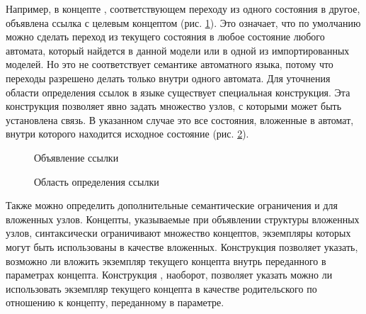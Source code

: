 Например, в концепте
, соответствующем переходу из одного состояния в другое, объявлена ссылка 
 с целевым концептом  (рис. \ref{fig:LinkDeclaration}). Это означает, что по
умолчанию можно сделать переход из текущего состояния в любое состояние любого автомата, который найдется в данной модели
или в одной из импортированных моделей. Но это не соответствует семантике автоматного языка, потому что переходы разрешено
делать только внутри одного автомата. Для уточнения области определения ссылок в языке 
 существует специальная конструкция. Эта конструкция позволяет явно задать множество узлов, с которыми может быть установлена связь. В указанном случае это все состояния, вложенные в автомат, внутри которого находится исходное состояние (рис. \ref{fig:SearchScope}).

\begin{figure}
 \centering
 \caption{Объявление ссылки }
 \label{fig:LinkDeclaration}
\end{figure}

\begin{figure}
 \centering
 \caption{Область определения ссылки }
 \label{fig:SearchScope}
\end{figure}

Также можно определить дополнительные семантические ограничения и для вложенных узлов. Концепты, указываемые при объявлении структуры вложенных узлов, синтаксически ограничивают множество концептов, экземпляры которых могут быть использованы в качестве вложенных. Конструкция  позволяет указать, возможно ли вложить экземпляр текущего концепта внутрь переданного в параметрах концепта. Конструкция , наоборот, позволяет указать можно ли использовать экземпляр текущего концепта в качестве родительского по отношению к концепту, переданному в параметре.